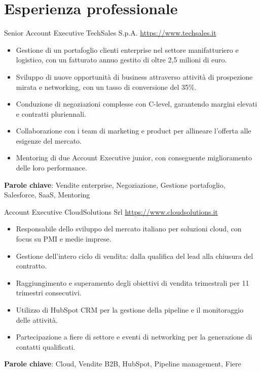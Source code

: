 \documentclass[a4paper, serif, 10pt]{moderncv}
\begin{document}
\section{Esperienza professionale}

        {Senior Account Executive}
        {TechSales S.p.A.}
        {\url{https://www.techsales.it}}
        {}
        {\begin{itemize}
\item Gestione di un portafoglio clienti enterprise nel settore manifatturiero e logistico, con un fatturato annuo gestito di oltre 2,5 milioni di euro.
\item Sviluppo di nuove opportunità di business attraverso attività di prospezione mirata e networking, con un tasso di conversione del 35\%.
\item Conduzione di negoziazioni complesse con C-level, garantendo margini elevati e contratti pluriennali.
\item Collaborazione con i team di marketing e product per allineare l'offerta alle esigenze del mercato.
\item Mentoring di due Account Executive junior, con conseguente miglioramento delle loro performance.
\end{itemize}
\textbf{Parole chiave}: Vendite enterprise, Negoziazione, Gestione portafoglio, Salesforce, SaaS, Mentoring}

        {Account Executive}
        {CloudSolutions Srl}
        {\url{https://www.cloudsolutions.it}}
        {}
        {\begin{itemize}
\item Responsabile dello sviluppo del mercato italiano per soluzioni cloud, con focus su PMI e medie imprese.
\item Gestione dell'intero ciclo di vendita: dalla qualifica del lead alla chiusura del contratto.
\item Raggiungimento e superamento degli obiettivi di vendita trimestrali per 11 trimestri consecutivi.
\item Utilizzo di HubSpot CRM per la gestione della pipeline e il monitoraggio delle attività.
\item Partecipazione a fiere di settore e eventi di networking per la generazione di contatti qualificati.
\end{itemize}
\textbf{Parole chiave}: Cloud, Vendite B2B, HubSpot, Pipeline management, Fiere}
\end{document}
